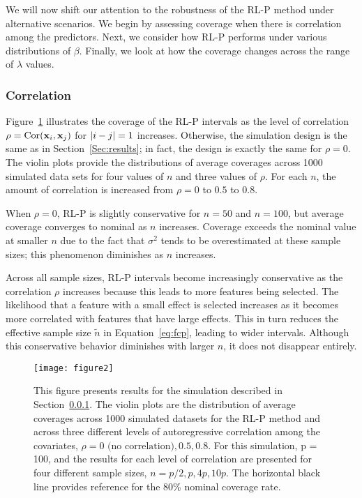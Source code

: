 We will now shift our attention to the robustness of the RL-P method under alternative scenarios. We begin by assessing coverage when there is correlation among the predictors. Next, we consider how RL-P performs under various distributions of $\beta$. Finally, we look at how the coverage changes across the range of $\lambda$ values.

\subsubsection{Correlation}
\label{Sec:correlation}

Figure~\ref{fig:2} illustrates the coverage of the RL-P intervals as the level of correlation $\rho = \textrm{Cor}(\mathbf{x}_i, \mathbf{x}_j)$ for $\left\lvert i-j\right\rvert = 1$ increases. Otherwise, the simulation design is the same as in Section~\ref{Sec:results}; in fact, the design is exactly the same for $\rho = 0$. The violin plots provide the distributions of average coverages across 1000 simulated data sets for four values of $n$ and three values of $\rho$. For each $n$, the amount of correlation is increased from $\rho = 0$ to $0.5$ to $0.8$.

When $\rho = 0$, RL-P is slightly conservative for $n = 50$ and $n = 100$, but average coverage converges to nominal as $n$ increases. Coverage exceeds the nominal value at smaller $n$ due to the fact that $\sigma^2$ tends to be overestimated at these sample sizes; this phenomenon diminishes as $n$ increases.

Across all sample sizes, RL-P intervals become increasingly conservative as the correlation $\rho$ increases because this leads to more features being selected. The likelihood that a feature with a small effect is selected increases as it becomes more correlated with features that have large effects. This in turn reduces the effective sample size $\tilde{n}$ in Equation~\ref{eq:fcp}, leading to wider intervals. Although this conservative behavior diminishes with larger $n$, it does not disappear entirely.

\begin{figure}[htb!]
  \begin{center}
    \texttt{[image: figure2]}
    \caption{\label{fig:2} This figure presents results for the simulation described in Section~\ref{Sec:correlation}. The violin plots are the distribution of average coverages across 1000 simulated datasets for the RL-P method and across three different levels of autoregressive correlation among the covariates, $\rho = 0 \text{ (no correlation)}, 0.5, 0.8$. For this simulation, p = 100, and the results for each level of correlation are presented for four different sample sizes, $n = p/2, p, 4p, 10p$. The horizontal black line provides reference for the 80\% nominal coverage rate.}
  \end{center}
\end{figure}

